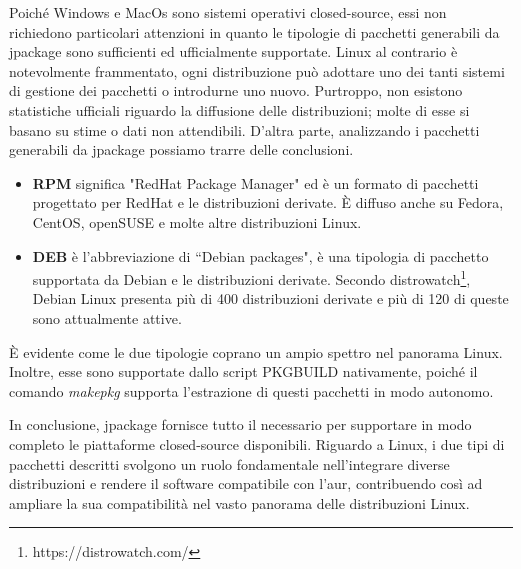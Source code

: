 Poiché Windows e MacOs sono sistemi operativi closed-source, essi non richiedono particolari attenzioni in quanto le tipologie di pacchetti generabili da jpackage sono sufficienti ed ufficialmente supportate. Linux al contrario è notevolmente frammentato, ogni distribuzione può adottare uno dei tanti sistemi di gestione dei pacchetti o introdurne uno nuovo. Purtroppo, non esistono statistiche ufficiali riguardo la diffusione delle distribuzioni; molte di esse si basano su stime o dati non attendibili. D'altra parte, analizzando i pacchetti generabili da jpackage possiamo trarre delle conclusioni.
\begin{itemize}
	\item \textbf{RPM} significa "RedHat Package Manager" ed è un formato di pacchetti progettato per RedHat e le distribuzioni derivate. È diffuso anche su Fedora, CentOS, openSUSE e molte altre distribuzioni Linux.
	\item \textbf{DEB} è l'abbreviazione di ``Debian packages", è una tipologia di pacchetto supportata da Debian e le distribuzioni derivate. Secondo distrowatch\footnote{https://distrowatch.com/}, Debian Linux presenta più di 400 distribuzioni derivate e più di 120 di queste sono attualmente attive.
\end{itemize}
È evidente come le due tipologie coprano un ampio spettro nel panorama Linux. Inoltre, esse sono supportate dallo script PKGBUILD nativamente, poiché il comando \textit{makepkg} supporta l'estrazione di questi pacchetti in modo autonomo. 

In conclusione, jpackage fornisce tutto il necessario per supportare in modo completo le piattaforme closed-source disponibili. Riguardo a Linux, i due tipi di pacchetti descritti svolgono un ruolo fondamentale nell'integrare diverse distribuzioni e rendere il software compatibile con l'\ac{aur}, contribuendo così ad ampliare la sua compatibilità nel vasto panorama delle distribuzioni Linux.
